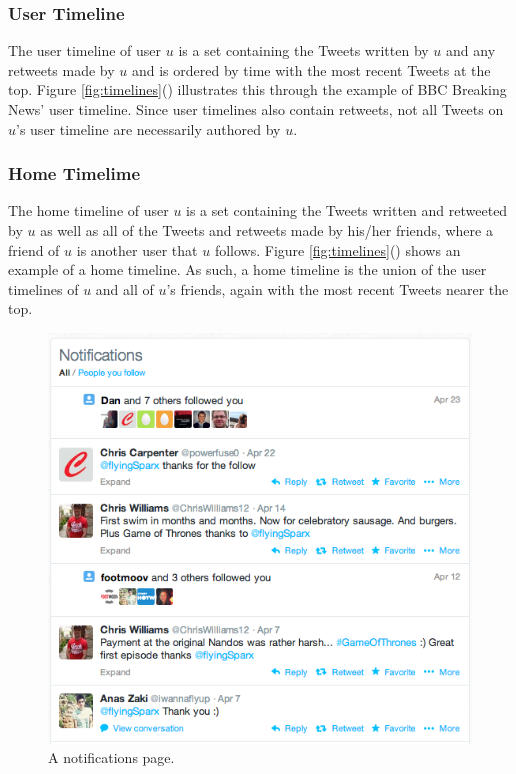 \subsubsection{User Timeline}
The user timeline of user $u$ is a set containing the Tweets written by $u$ and any retweets made by $u$ and is ordered by time with the most recent Tweets at the top.  Figure \ref{fig:timelines}() illustrates this through the example of BBC Breaking News' user timeline. Since user timelines also contain retweets, not all Tweets on $u$'s user timeline are necessarily authored by $u$.

\subsubsection{Home Timelime}
The home timeline of user $u$ is a set containing the Tweets written and retweeted by $u$ as well as all of the Tweets and retweets made by his/her friends, where a friend of $u$ is another user that $u$ follows. Figure \ref{fig:timelines}() shows an example of a home timeline. As such, a home timeline is the union of the user timelines of $u$ and all of $u$'s friends, again with the most recent Tweets nearer the top.

\begin{figure}[h]
\centering
\includegraphics[scale=0.6]{2.Background/Media/notifications_page.png} 
\caption{A notifications page.}
\label{fig:notifications_page}
\end{figure}

